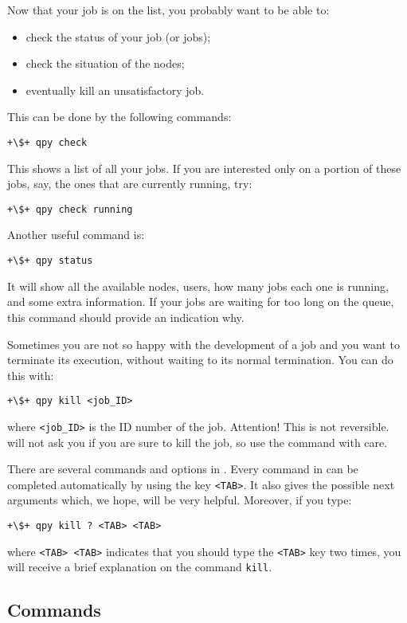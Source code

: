 \documentclass[a4paper,12pt]{article}
\begin{document}
Now that your job is on the list, you probably want to be able to:
\begin{itemize}
\item check the status of your job (or jobs);
\item check the situation of the nodes;
\item eventually kill an unsatisfactory job.
\end{itemize}
This can be done by the following commands:
\begin{lstlisting}[style=BashStyle]
+\$+ qpy check
\end{lstlisting}
This shows a list of all your jobs.
If you are interested only on a portion of these jobs, say, the ones that are currently running, try:
\begin{lstlisting}[style=BashStyle]
+\$+ qpy check running
\end{lstlisting}
Another useful \qpy{} command is:
\begin{lstlisting}[style=BashStyle]
+\$+ qpy status
\end{lstlisting}
It will show all the available nodes, users, how many jobs each one is running, and some extra information.
If your jobs are waiting for too long on the queue, this command should provide an indication why.

Sometimes you are not so happy with the development of a job and you want to terminate its execution, without waiting to its normal termination.
You can do this with:
\begin{lstlisting}[style=BashStyle]
+\$+ qpy kill <job_ID>
\end{lstlisting}
where \texttt{<job\_ID>} is the ID number of the job.
Attention! This is not reversible.
\qpy{} will not ask you if you are sure to kill the job, so use the command with care.

There are several commands and options in \qpy{}.
Every command in \qpy{} can be completed automatically by using the key \texttt{<TAB>}.
It also gives the possible next arguments which, we hope, will be very helpful.
Moreover, if you type:
\begin{lstlisting}[style=BashStyle]
+\$+ qpy kill ? <TAB> <TAB>
\end{lstlisting}
where \texttt{<TAB> <TAB>} indicates that you should type the \texttt{<TAB>} key two times, you will receive a brief explanation on the command \texttt{kill}.

\subsection{Commands}\label{sec:user_commands}
\end{document}

